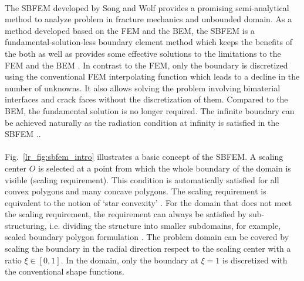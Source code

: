 \paragraph{}
The SBFEM developed by Song and Wolf \citep{Wolf1996} provides a promising semi-analytical method to analyze problem in fracture mechanics and unbounded domain.
As a method developed based on the FEM and the BEM, the SBFEM is a fundamental-solution-less boundary element method which keeps the benefits of the both as well as provides some effective solutions to the limitations to the FEM and the BEM \citep{Wol1999}.
In contrast to the FEM, only the boundary is discretized using the conventional FEM interpolating function which leads to a decline in the number of unknowns.
It also allows solving the problem involving bimaterial interfaces and crack faces without the discretization of them.
Compared to the BEM, the fundamental solution is no longer required.
The infinite boundary can be achieved naturally as the radiation condition at infinity is satisfied in the SBFEM \citep{Wol2003}..

\paragraph{}
Fig.~\ref{lr_fig:sbfem_intro} illustrates a basic concept of the SBFEM.
A scaling center $O$ is selected at a point from which the whole boundary of the domain is visible (scaling requirement).
This condition is automatically satisfied for all convex polygons and many concave polygons.
The scaling requirement is equivalent to the notion of `star convexity' \citep{Bishop2014}.
For the domain that does not meet the scaling requirement, the requirement can always be satisfied by sub-structuring, i.e. dividing the structure into smaller subdomains, for example, scaled boundary polygon formulation \citep{NATARAJAN2014101}.
The problem domain can be covered by scaling the boundary in the radial direction respect to the scaling center with a ratio $\xi \in [0,1]$.
In the domain, only the boundary at $\xi=1$ is discretized with the conventional shape functions.

